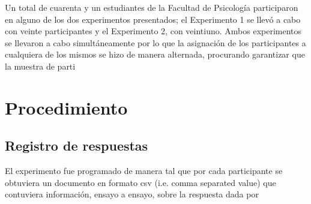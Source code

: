 Un total de cuarenta y un estudiantes de la Facultad de Psicología participaron en alguno de los dos experimentos presentados; el Experimento 1 se llevó a cabo con veinte participantes y el Experimento 2, con veintiuno. Ambos experimentos se llevaron a cabo simultáneamente por lo que la asignación de los participantes a cualquiera de los mismos se hizo de manera alternada, procurando garantizar que la muestra de parti

\section{Procedimiento}



\subsection{Registro de respuestas}

El experimento fue programado de manera tal que por cada participante se obtuviera un documento en formato csv (i.e. comma separated value) que contuviera información, ensayo a ensayo, sobre la respuesta dada por 
